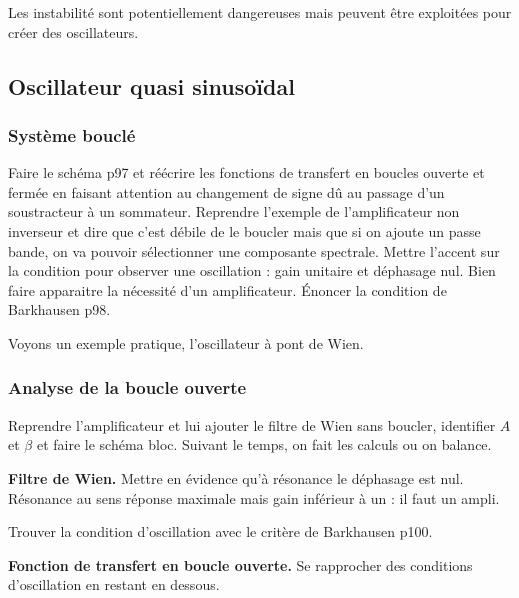 \begin{transition}
Les instabilité sont potentiellement dangereuses mais peuvent être exploitées pour créer des oscillateurs.
\end{transition}

\subsection{Oscillateur quasi sinusoïdal}

\subsubsection{Système bouclé}

Faire le schéma \cite{Neveu2019a} p97 et réécrire les fonctions de transfert en boucles ouverte et fermée en faisant attention au changement de signe dû au passage d'un soustracteur à un sommateur.
Reprendre l'exemple de l'amplificateur non inverseur et dire que c'est débile de le boucler mais que si on ajoute un passe bande, on va pouvoir sélectionner une composante spectrale.
Mettre l'accent sur la condition pour observer une oscillation : gain unitaire et déphasage nul.
Bien faire apparaitre la nécessité d'un amplificateur.
Énoncer la condition de Barkhausen \cite{Neveu2019a} p98.

\begin{transition}
Voyons un exemple pratique, l'oscillateur à pont de Wien.
\end{transition}

\subsubsection{Analyse de la boucle ouverte}

Reprendre l'amplificateur et lui ajouter le filtre de Wien sans boucler, identifier $A$ et $\beta$ et faire le schéma bloc.
Suivant le temps, on fait les calculs ou on balance.

\begin{experience}
\textbf{Filtre de Wien.}
Mettre en évidence qu'à résonance le déphasage est nul.
Résonance au sens réponse maximale mais gain inférieur à un : il faut un ampli.
\end{experience}

Trouver la condition d'oscillation avec le critère de Barkhausen \cite{Neveu2019a} p100.

\begin{experience}
\textbf{Fonction de transfert en boucle ouverte.}
Se rapprocher des conditions d'oscillation en restant en dessous.
\end{experience}

